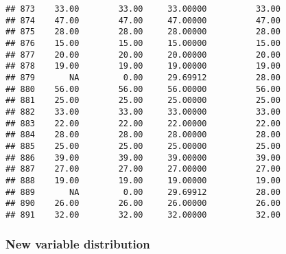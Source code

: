 \documentclass[
]{article}
\begin{document}
\begin{verbatim}
## 873    33.00        33.00     33.00000          33.00
## 874    47.00        47.00     47.00000          47.00
## 875    28.00        28.00     28.00000          28.00
## 876    15.00        15.00     15.00000          15.00
## 877    20.00        20.00     20.00000          20.00
## 878    19.00        19.00     19.00000          19.00
## 879       NA         0.00     29.69912          28.00
## 880    56.00        56.00     56.00000          56.00
## 881    25.00        25.00     25.00000          25.00
## 882    33.00        33.00     33.00000          33.00
## 883    22.00        22.00     22.00000          22.00
## 884    28.00        28.00     28.00000          28.00
## 885    25.00        25.00     25.00000          25.00
## 886    39.00        39.00     39.00000          39.00
## 887    27.00        27.00     27.00000          27.00
## 888    19.00        19.00     19.00000          19.00
## 889       NA         0.00     29.69912          28.00
## 890    26.00        26.00     26.00000          26.00
## 891    32.00        32.00     32.00000          32.00
\end{verbatim}

\hypertarget{new-variable-distribution}{%
\subsubsection{New variable
distribution}\label{new-variable-distribution}}
\end{document}

